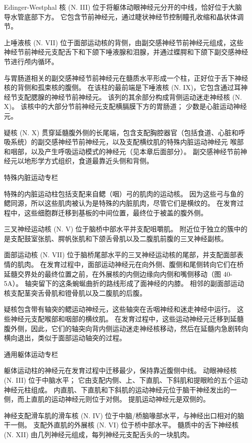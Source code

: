Edinger-Westphal 核 (N. III) 位于将躯体动眼神经元分开的中线，恰好位于大脑导水管底部下方。 它包含节前神经元，通过睫状神经节控制瞳孔收缩和晶状体调节。

上唾液核 (N. VII) 位于面部运动核的背侧，由副交感神经节前神经元组成，这些神经节前神经元支配舌下和下颌下唾液腺和泪腺，并通过蝶腭和下颌下副交感神经节进行颅内循环。

与胃肠道相关的副交感神经节前神经元在髓质水平形成一个柱，正好位于舌下神经核的背侧和孤束核的腹侧。 在该柱的最前端是下唾液核 (N. IX)，它包含通过耳神经节支配腮腺的神经节前神经元。 该列的其余部分构成背侧运动迷走神经核 (N. X)。 该核中的大部分节前神经元支配横膈膜下方的胃肠道； 少数是心脏运动神经元。

疑核 (N. X) 贯穿延髓腹外侧的长尾端，包含支配胸腔器官（包括食道、心脏和呼吸系统）的副交感神经节前神经元，以及支配横纹肌的特殊内脏运动神经元 喉部和咽部，以及产生呼吸运动模式的神经元（见本章后面部分）。 副交感神经节前神经元以地形学方式组织，食道最靠近头侧和背侧。

特殊内脏运动专栏

特殊的内脏运动柱包括支配来自鳃（咽）弓的肌肉的运动核。 因为这些弓与鱼的鳃同源，所以这些肌肉被认为是特殊的内脏肌肉，尽管它们是横纹的。 在发育过程中，这些细胞群迁移到基板的中间位置，最终位于被盖的腹外侧。

三叉神经运动核 (N. V) 位于脑桥中部水平并支配咀嚼肌。 附近位于独立的簇中的是支配鼓室张肌、腭帆张肌和下颌舌骨肌以及二腹肌前腹的三叉神经副核。

面部运动核 (N. VII) 位于脑桥尾部水平的三叉神经运动核的尾部，并支配面部表情的肌肉。 在发育过程中，面部运动神经元在向外侧、腹侧和尾侧转向它们在桥延髓交界处的最终位置之前，在外展核的内侧边缘向内侧和嘴侧移动（图 40-5A）。 轴突留下的这条蜿蜒曲折的路线形成了面神经的内膝。 相邻的副面部运动核支配茎突舌骨肌和镫骨肌以及二腹肌的后腹。

疑核包含带有轴突的鳃运动神经元，这些轴突在舌咽神经和迷走神经中运行。 这些神经元支配喉部和咽部的横纹肌。 在发育过程中，这些运动神经元迁移到延髓腹外侧，因此，它们的轴突向背内侧运动迷走神经核移动，然后在延髓内急剧转向横向退出，类似于面部运动轴突的过程。

通用躯体运动专栏

躯体运动柱的神经元在发育过程中迁移最少，保持靠近腹侧中线。 动眼神经核 (N. III) 位于中脑水平； 它由支配内侧、上、下直肌、下斜肌和提眼睑的五个运动神经元柱组成。 内直肌、下直肌和下斜肌的运动神经元位于脑干神经发出的一侧，而上直肌的运动神经元则位于对侧。 提肌运动神经元是双侧的。

神经支配滑车肌的滑车核 (N. IV) 位于中脑/桥脑喙部水平，与神经出口相对的脑干一侧。 支配外直肌的外展核 (N. VI) 位于桥中部水平。 髓质中的舌下神经核 (N. XII) 由几列神经元组成，每列神经元支配舌头的一块肌肉。



